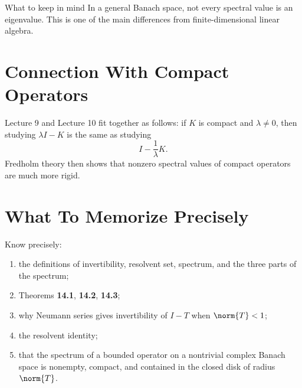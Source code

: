 \documentclass[header={Lecture 10 Exam Study Notes}]{study-note}
\begin{document}
\begin{exbox}{What to keep in mind}
In a general Banach space, not every spectral value is an eigenvalue. This is one of the main differences from finite-dimensional linear algebra.
\end{exbox}

\section{Connection With Compact Operators}

\begin{focusbox}
Lecture 9 and Lecture 10 fit together as follows: if $K$ is compact and $\lambda\neq 0$, then studying $\lambda I-K$ is the same as studying
\[
I-\frac{1}{\lambda}K.
\]
Fredholm theory then shows that nonzero spectral values of compact operators are much more rigid.
\end{focusbox}

\section{What To Memorize Precisely}

\begin{focusbox}
Know precisely:
\begin{enumerate}
\item the definitions of invertibility, resolvent set, spectrum, and the three parts of the spectrum;
\item Theorems \textbf{14.1}, \textbf{14.2}, \textbf{14.3};
\item why Neumann series gives invertibility of $I-T$ when $\norm{T}<1$;
\item the resolvent identity;
\item that the spectrum of a bounded operator on a nontrivial complex Banach space is nonempty, compact, and contained in the closed disk of radius $\norm{T}$.
\end{enumerate}
\end{focusbox}
\end{document}
